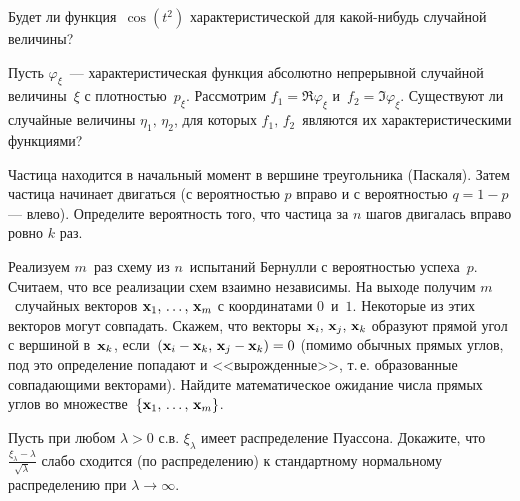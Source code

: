 \begin{comment}
\begin{ordre}
Характеристическая функция обладает следующими свойствами:
\begin{fixme}
Iterate the properties 
\end{fixme}
\end{ordre}
\end{comment}


\begin{problem}
Будет ли функция~$\cos(t^2)$ характеристической для какой-нибудь случайной величины?
\end{problem}

\begin{problem}
Пусть $\varphi_{\xi}$~--- характеристическая функция абсолютно непрерывной случайной величины~$\xi$ с плотностью~$p_{\xi}$. Рассмотрим $f_1 = \Re \varphi_{\xi}$ и~$f_2 = \Im \varphi_{\xi} $. Существуют ли случайные величины $\eta_1,\,\eta_2$, для которых $f_1,\,f_2$~являются их характеристическими функциями? 
\end{problem}



\begin{problem}
Частица находится в начальный момент в вершине треугольника (Паскаля). Затем частица начинает двигаться (с вероятностью $p$ вправо и 
с вероятностью $q = 1-p$ --- влево). Определите вероятность того, что частица за $n$ шагов 
двигалась вправо ровно $k$ раз. 
\end{problem}

\begin{problem}
Реализуем $m$~раз схему из $n$~испытаний Бернулли с вероятностью успеха~$p$. Считаем, что все реализации схем взаимно независимы. На выходе получим $m$~случайных векторов ${\bf x}_1,\,\dots,\,{\bf x}_m$ с координатами $0$~и~$1$. Некоторые из этих векторов могут совпадать. Скажем, что векторы ${\bf x}_i,\,{\bf x}_j,\,{\bf x}_k$ образуют прямой угол с вершиной в~${\bf x}_k$, если~$({\bf x}_i-{\bf x}_k,\,{\bf x}_j - {\bf x}_k) = 0$ (помимо обычных прямых углов, под это определение попадают и <<вырожденные>>, т.\,е. образованные совпадающими векторами). Найдите математическое ожидание числа прямых углов во множестве~$\{{\bf x}_1,\,\dots,\,{\bf x}_m\}$.
\end{problem}



\begin{problem}
Пусть при любом $\lambda >0$ с.в. $\xi _{\lambda } $ имеет распределение Пуассона. Докажите, что $\frac{\xi _{\lambda } -\lambda }{\sqrt{\lambda } } $ слабо сходится (по распределению) к стандартному нормальному распределению при $\lambda \to \infty $.

\begin{comment}
\begin{ordre}
 Используйте аппарат характеристических функций и теорему о непрерывном соответствии (о том, что слабая сходимость эквивалентна равномерной сходимости соответствующих характеристических функций).
 \end{ordre}
\end{comment}

\end{problem}


